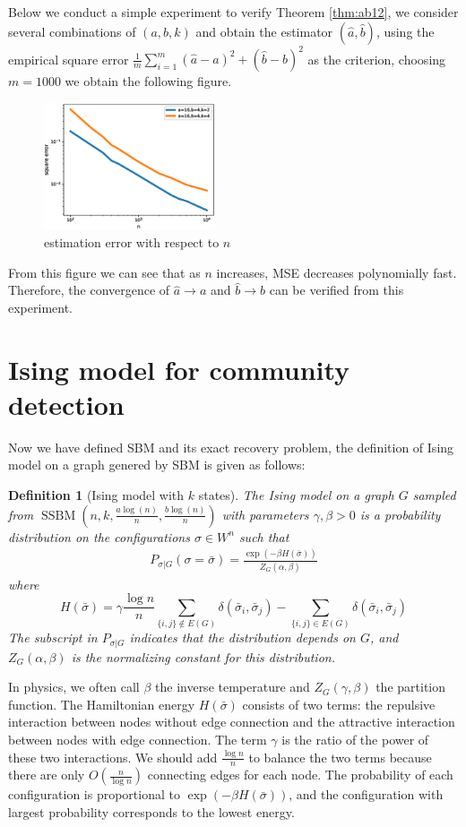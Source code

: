 \documentclass[journal]{IEEEtran}
\newtheorem{definition}{Definition}
\newcommand{\A}{\frac{a \log(n)}{n}}
\newcommand{\B}{\frac{b \log(n)}{n}}
\newcommand{\1}{\mathbbm{1}}
\DeclareMathOperator{\SSBM}{SSBM}
\begin{document}
Below we conduct a simple experiment to verify Theorem \ref{thm:ab12},
we consider several combinations of $(a,b,k)$ and obtain the estimator $(\hat{a}, \hat{b})$, using
the empirical square error $\frac{1}{m} \sum_{i=1}^m (\hat{a}-a)^2 + (\hat{b}-b)^2$ as the criterion,
choosing $m=1000$ we obtain the following figure.
\begin{figure}[!ht]
	\centering
	\includegraphics[width=0.45\textwidth]{estimator-error-2020-11-12.eps}
	\caption{estimation error with respect to $n$}
\end{figure}
From this figure we can see that as $n$ increases, MSE decreases polynomially fast. Therefore, the convergence
of $\hat{a} \to a$ and $\hat{b} \to b$ can be verified from this experiment.

\section{Ising model for community detection}\label{sec:sibm}
Now we have defined SBM and its exact recovery problem, the definition of Ising model on a graph genered by SBM is given
as follows:
\begin{definition}[Ising model with $k$ states]\label{def:ising}
	The Ising model on a graph $G$ sampled from $\SSBM(n,k,\A,\B)$ with parameters $\gamma,\beta>0$
	is a probability distribution on the configurations $\sigma\in W^n$ such that
	\begin{align} \label{eq:isingma}
	P_{\sigma|G}(\sigma=\bar{\sigma})=\frac{\exp(-\beta H(\bar{\sigma}))}{Z_G(\alpha,\beta)}
	\end{align}
	where
	\begin{equation}\label{eq:energy}
	H(\bar{\sigma}) = \gamma \frac{\log n}{n} \sum_{\{i,j\}\not\in E(G)} \delta(\bar{\sigma}_i, \bar{\sigma}_j)
	- \sum_{\{i,j\}\in E(G)} \delta(\bar{\sigma}_i, \bar{\sigma}_j)
	\end{equation}
	The subscript in $P_{\sigma|G}$ indicates that the distribution depends on $G$, and
	$Z_G(\alpha,\beta)$ is the normalizing constant for this distribution.
\end{definition}
In physics, we often call $\beta$ the inverse temperature and $Z_G(\gamma, \beta)$ the partition function.
The Hamiltonian energy $H(\bar{\sigma})$ consists of two terms: the repulsive interaction between nodes without edge connection
and the attractive interaction between nodes with edge connection. The term $\gamma$ is the ratio of the power of these two
interactions. We should add $\frac{\log n}{n}$ to balance the two terms because there are only $O(\frac{n}{\log n})$
connecting edges for each node.
The probability of each configuration is proportional to $\exp(-\beta H(\bar{\sigma}))$, and the configuration with largest
probability corresponds to the lowest energy.
\end{document}
